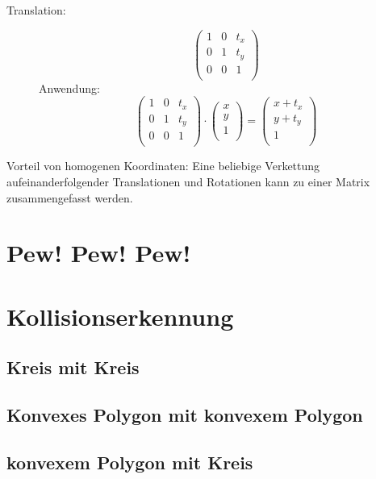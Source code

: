 \documentclass{article}
\begin{document}
\begin{description}
 \item[Translation:]
  \begin{equation}
   \left(\begin{array}{ccc}
    1 & 0 & t_{x} \\
    0 & 1 & t_{y} \\
    0 & 0 & 1 \\
   \end{array}\right)
  \end{equation}
  Anwendung:
  \begin{equation}
   \left(\begin{array}{ccc}
    1 & 0 & t_{x} \\
    0 & 1 & t_{y} \\
    0 & 0 & 1 \\
   \end{array}\right)
   \cdot
   \left(\begin{array}{ccc}
    x \\
    y \\
    1 \\
   \end{array}\right)
   =
   \left(\begin{array}{ccc}
    x + t_{x} \\
    y + t_{y} \\
    1 \\
   \end{array}\right)
  \end{equation}
\end{description}
Vorteil von homogenen Koordinaten:
Eine beliebige Verkettung aufeinanderfolgender Translationen
und Rotationen kann zu einer Matrix zusammengefasst werden.


\section{Pew! Pew! Pew!}

\section{Kollisionserkennung}
\subsection{Kreis mit Kreis}

\subsection{Konvexes Polygon mit konvexem Polygon}

\subsection{konvexem Polygon mit Kreis}
\end{document}
